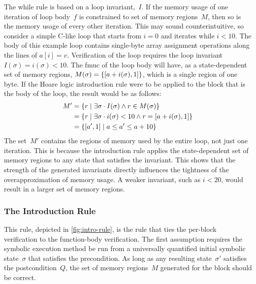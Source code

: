 The while rule is based on a loop invariant,~$I$.
If the memory usage of one iteration of loop body~$f$
is constrained to set of memory regions~$M$,
then so is the memory usage of every other iteration.
This may sound counterintuitive,
so consider a simple C-like loop that starts from $i=0$ and iterates while $i<10$.
The body of this example loop contains single-byte array assignment operations
along the lines of $a[i]=v$.
Verification of the loop requires the loop invariant $I(\sigma)=i(\sigma)<10$.
The \ac{fmuc} of the loop body will have, as a state-dependent set of memory regions, $M(\sigma)=\{[a+i(\sigma),1]\}$, which is a single region of one byte.
If the Hoare logic introduction rule were to be applied to the block
that is the body of the loop, the result would be as follows:
\begin{subequations}
  \begin{align}
    M' &= \{r\mid\exists\sigma\cdot I(\sigma)\wedge r\in M(\sigma)\} \\
    &= \{r\mid\exists\sigma\cdot i(\sigma)<10\wedge r=[a+i(\sigma),1]\} \\
    &= \{[a',1]\mid a\leq a'\le a+10\}
  \end{align}
\end{subequations}
The set~$M'$ contains the regions of memory used by the entire loop,
not just one iteration.
This is because the introduction rule applies the state-dependent set of memory regions
to any state that satisfies the invariant.
This shows that the strength of the generated invariants directly influences the tightness of the overapproximation of memory usage.
A weaker invariant, such as $i<20$, would result in a larger set of memory regions.

\subsubsection{The Introduction Rule}
This rule, depicted in \cref{fig:intro-rule},
is the rule that ties the per-block verification to the function-body verification.
The first assumption requires the symbolic execution method be run
from a universally quantified initial symbolic state~$\sigma$ that satisfies the precondition.
As long as any resulting state~$\sigma'$ satisfies the postcondition~$Q$,
the set of memory regions~$M$ generated for the block should be correct.

